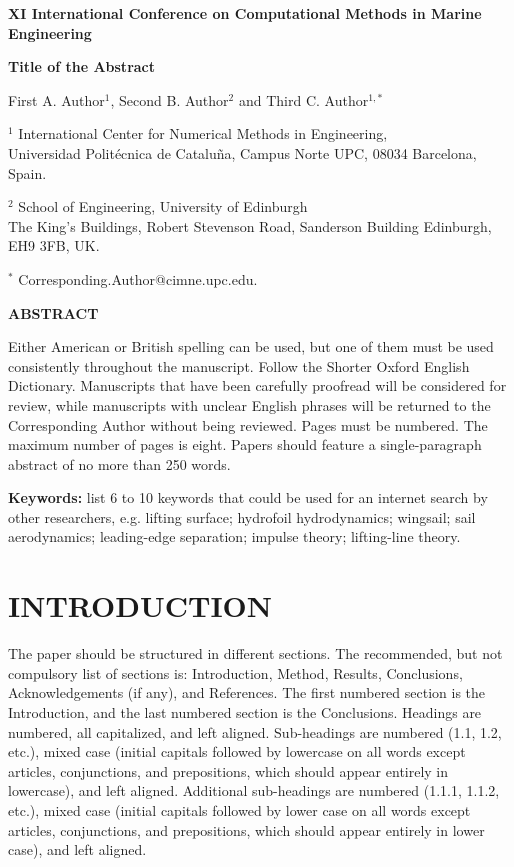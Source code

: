 \documentclass[oneside, a4paper, onecolumn, 11pt]{article}
\begin{document}
\begin{center}
\textbf{XI International Conference on Computational Methods in Marine Engineering}

\bigskip
{\Large \textbf{Title of the Abstract}} \\
\bigskip

First A. Author$^1$, Second B. Author$^2$ and Third C. Author$^{1,*}$
  
$^1$ International Center for Numerical Methods in Engineering, \\
Universidad Politécnica de Cataluña, Campus Norte UPC, 08034 Barcelona, Spain.

$^2$ School of Engineering, University of Edinburgh \\
The King’s Buildings, Robert Stevenson Road, Sanderson Building Edinburgh, EH9 3FB, UK.

$^*$ Corresponding.Author@cimne.upc.edu.

\bigskip
{\Large \textbf{ABSTRACT}} \\
\bigskip
\end{center}

Either American or British spelling can be used, but one of them must be used consistently throughout the manuscript. Follow the Shorter Oxford English Dictionary. Manuscripts that have been carefully proofread will be considered for review, while manuscripts with unclear English phrases will be returned to the Corresponding Author without being reviewed. Pages must be numbered. The maximum number of pages is eight. Papers should feature a single-paragraph abstract of no more than 250 words. 


\textbf{Keywords:} list 6 to 10 keywords that could be used for an internet search by other researchers, e.g. lifting surface; hydrofoil hydrodynamics; wingsail; sail aerodynamics; leading-edge separation; impulse theory; lifting-line theory.


\section{INTRODUCTION} \label{sec:intro}
The paper should be structured in different sections. The recommended, but not compulsory list of sections is: Introduction, Method, Results, Conclusions, Acknowledgements (if any), and References. 
The first numbered section is the Introduction, and the last numbered section is the Conclusions. Headings are numbered, all capitalized, and left aligned. Sub-headings are numbered (1.1, 1.2, etc.), mixed case (initial capitals followed by lowercase on all words except articles, conjunctions, and prepositions, which should appear entirely in lowercase), and left aligned. Additional sub-headings are numbered (1.1.1, 1.1.2, etc.), mixed case (initial capitals followed by lower case on all words except articles, conjunctions, and prepositions, which should appear entirely in lower case), and left aligned.
\end{document}

